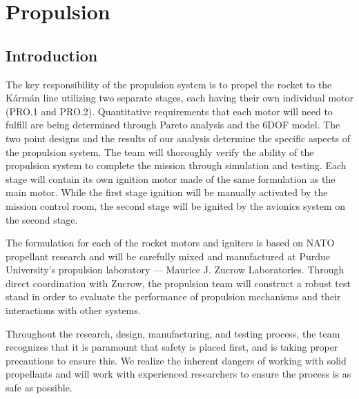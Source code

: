 \section{Propulsion} \label{section:propulsion}
\subsection{Introduction} %

The key responsibility of the propulsion system is to propel the rocket to the K\'{a}rm\'{a}n line utilizing two separate stages, each having their own individual motor (PRO.1 and PRO.2). Quantitative requirements that each motor will need to fulfill are being determined through Pareto analysis and the 6DOF model. The two point designs and the results of our analysis determine the specific aspects of the propulsion system. The team will thoroughly verify the ability of the propulsion system to complete the mission through simulation and testing. Each stage will contain its own ignition motor made of the same formulation as the main motor. While the first stage ignition will be manually activated by the mission control room, the second stage will be ignited by the avionics system on the second stage.

The formulation for each of the rocket motors and igniters is based on NATO propellant research \cite{butacene} and will be carefully mixed and manufactured at Purdue University's propulsion laboratory --- Maurice J. Zucrow Laboratories. Through direct coordination with Zucrow, the propulsion team will construct a robust test stand in order to evaluate the performance of propulsion mechanisms and their interactions with other systems.

Throughout the research, design, manufacturing, and testing process, the team recognizes that it is paramount that safety is placed first, and is taking proper precautions to ensure this. We realize the inherent dangers of working with solid propellants and will work with experienced researchers to ensure the process is as safe as possible.


